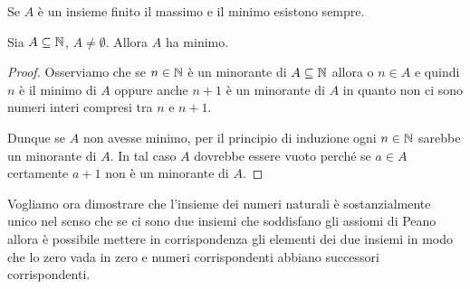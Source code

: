 Se $A$ è un insieme finito il massimo e il minimo esistono sempre.

\begin{theorem}
  \label{th:buon_ordinamento}
  Sia $A\subseteq \mathbb N$, $A\neq \emptyset$. 
  Allora $A$ ha minimo.
\end{theorem}
%
\begin{proof}
  Osserviamo che se $n\in \mathbb N$ è un minorante di $A\subseteq \mathbb N$ 
  allora o $n\in A$ e quindi $n$ è il minimo di $A$
  oppure anche $n+1$ è un minorante di $A$ in quanto 
  non ci sono numeri interi compresi tra $n$ e $n+1$.

  Dunque se $A$ non avesse minimo, per il principio di induzione 
  ogni $n\in\mathbb N$ sarebbe un minorante di $A$.
  In tal caso $A$ dovrebbe essere vuoto perché se $a\in A$ 
  certamente $a+1$ non è un minorante di $A$.
\end{proof}

Vogliamo ora dimostrare che l'insieme dei numeri naturali è sostanzialmente 
unico nel senso che se ci sono due insiemi che soddisfano gli assiomi di 
Peano allora è possibile mettere in corrispondenza gli elementi dei due insiemi 
in modo che lo zero vada in zero e numeri corrispondenti abbiano successori 
corrispondenti.

